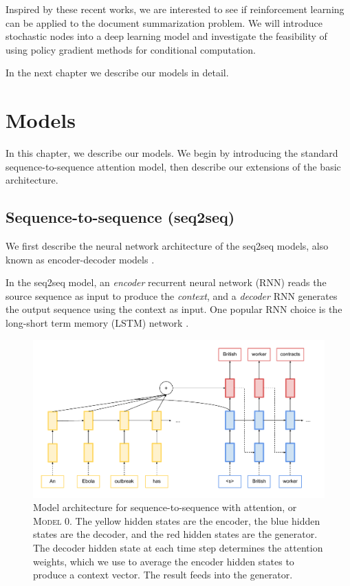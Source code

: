 \documentclass[12pt]{report}
\begin{document}
Inspired by these recent works, we are interested to see if reinforcement learning can be applied to the document summarization problem. We will introduce stochastic nodes into a deep learning model and investigate the feasibility of using policy gradient methods for conditional computation.

In the next chapter we describe our models in detail.


\chapter{Models}
\label{chap:models}

In this chapter, we describe our models. We begin by introducing the standard sequence-to-sequence attention model, then describe our extensions of the basic architecture.

\section{Sequence-to-sequence (seq2seq)}

We first describe the neural network architecture of the seq2seq models, also known as encoder-decoder models \citep{bahdanau2014neural}.


In the seq2seq model, an \emph{encoder} recurrent neural network (RNN) reads the source sequence as input to produce the \emph{context}, and a \emph{decoder} RNN generates the output sequence using the context as input.  One popular RNN choice is the long-short term memory (LSTM) network \citep{hochreiter1997long}.

\begin{figure}[t]
\includegraphics[width=\textwidth]{images/seq2seq}
\caption{Model architecture for sequence-to-sequence with attention, or \textsc{Model 0}. The yellow hidden states are the encoder, the blue hidden states are the decoder, and the red hidden states are the generator. The decoder hidden state at each time step determines the attention weights, which we use to average the encoder hidden states to produce a context vector. The result feeds into the generator.}
\label{fig:seq2seq}
\end{figure}
\end{document}
